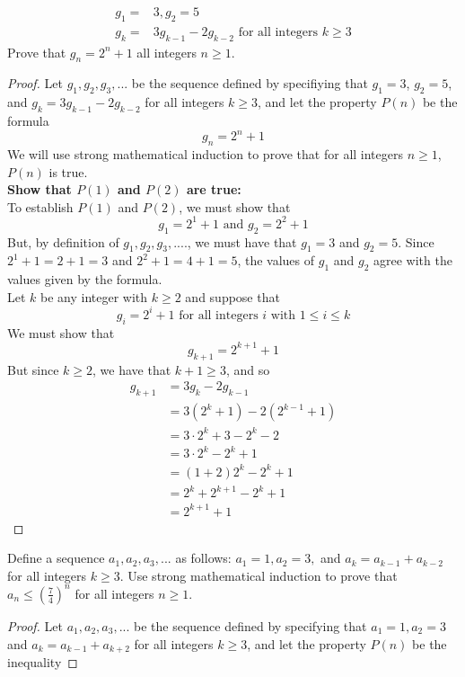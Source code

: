 \documentclass[12pt,letterpaper, onecolumn]{exam}
\begin{document}
\begin{questions}
\begin{align*}
			g_1=&3, g_2=5\\
			g_k=&3g_{k-1}-2g_{k-2}\textrm{  for all integers } k\geq3
		\end{align*}
					Prove that $g_n=2^n+1$ all integers $n\geq1.$
		\begin{solution}
			\begin{proof}
			Let  $g_1,g_2,g_3,...$ be the sequence defined by specifiying that $g_1=3$, $g_2=5$, and $g_k=3g_{k-1}-2g_{k-2}$ for all integers $k\geq3$, and let the property $P(n)$ be the formula
			$$g_{n}=2^n+1$$
			We will use strong mathematical induction to prove that for all integers $n\geq1$, $P(n)$ is true.\\
			\textbf{Show that $P(1)$ and $P(2)$ are true:}\\
			To establish $P(1)$ and $P(2)$, we must show that\\
			$$g_1=2^1+1 \textrm{ and } g_2=2^2+1$$
			But, by definition of $g_1,g_2,g_3,....$, we must have that $g_1=3$ and $g_2=5$. Since $2^1+1=2+1=3$ and $2^2+1=4+1=5$, the values of $g_1$ and $g_2$ agree with the values given by the formula.
			\\
			Let $k$ be any integer with $k\geq2$ and suppose that
			$$g_i=2^i+1 \textrm{ for all integers $i$ with } 1\leq i \leq k$$
			We must show that 
			$$g_{k+1}=2^{k+1}+1$$
			But since $k\geq2$, we have that $k+1 \geq3$, and so 
			\begin{align*}
				g_{k+1}&=3g_k-2g_{k-1}\\
				&=3(2^k+1)-2(2^{k-1}+1)\\
				&=3\cdot2^k+3-2^k-2\\
				&=3\cdot2^k-2^k+1\\
				&=(1+2)2^k-2^k+1\\
				&=2^k+2^{k+1}-2^k+1\\
				&=2^{k+1}+1
			\end{align*}
			\end{proof}
	\end{solution}
		\setcounter{question}{8} \question Define a sequence $a_1,a_2,a_3,...$ as follows: $a_1=1,a_2=3,$ and $a_k=a_{k-1}+a_{k-2}$ for all integers $k\geq3$. Use strong mathematical induction to prove that $a_n \leq \left(\frac{7}{4}\right)^n$ for all integers $n\geq1.$
		\begin{solution}
			\begin{proof}
			Let $a_1,a_2,a_3,...$  be the sequence defined by specifying that $a_1=1, a_2=3$ and $a_k=a_{k-1}+a_{k+2}$ for all integers $k\geq3$, and let the property $P(n)$ be the inequality

\end{proof}
\end{solution}
\end{questions}
\end{document}
